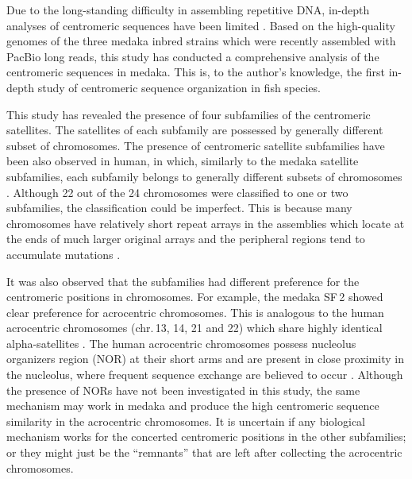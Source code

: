 Due to the long-standing difficulty in assembling repetitive DNA, in-depth analyses of centromeric sequences have been limited \cite{Plohl2014}. Based on the high-quality genomes of the three medaka inbred strains which were recently assembled with PacBio long reads, this study has conducted a comprehensive analysis of the centromeric sequences in medaka. This is, to the author's knowledge, the first in-depth study of centromeric sequence organization in fish species.

This study has revealed the presence of four subfamilies of the centromeric satellites. The satellites of each subfamily are possessed by generally different subset of chromosomes. The presence of centromeric satellite subfamilies have been also observed in human, in which, similarly to the medaka satellite subfamilies, each subfamily belongs to generally different subsets of chromosomes \cite{Alexandrov2001}. Although 22 out of the 24 chromosomes were classified to one or two subfamilies, the classification could be imperfect. This is because many chromosomes have relatively short repeat arrays in the assemblies which locate at the ends of much larger original arrays and the peripheral regions tend to accumulate mutations \cite{Smith1976, Schueler2001}.

It was also observed that the subfamilies had different preference for the centromeric positions in chromosomes. For example, the medaka SF\,2 showed clear preference for acrocentric chromosomes. This is analogous to the human acrocentric chromosomes (chr.\,13, 14, 21 and 22) which share highly identical alpha-satellites \cite{Willard1991}. The human acrocentric chromosomes possess nucleolus organizers region (NOR) at their short arms and are present in close proximity in the nucleolus, where frequent sequence exchange are believed to occur \cite{Willard1991}. Although the presence of NORs have not been investigated in this study, the same mechanism may work in medaka and produce the high centromeric sequence similarity in the acrocentric chromosomes. It is uncertain if any biological mechanism works for the concerted centromeric positions in the other subfamilies; or they might just be the ``remnants'' that are left after collecting the acrocentric chromosomes.

